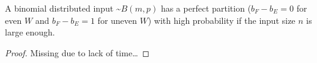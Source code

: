 \begin{lemma}\label{lemma:BinomialSolvable}
    A binomial distributed input \textasciitilde$B(m,p)$ has a perfect partition ($b_F - b_E = 0$ for even $W$ and $b_F - b_E = 1$ for uneven $W$) with high probability if the input size $n$ is large enough.
\end{lemma}
\begin{proof}
    Missing due to lack of time\dots
\end{proof}


